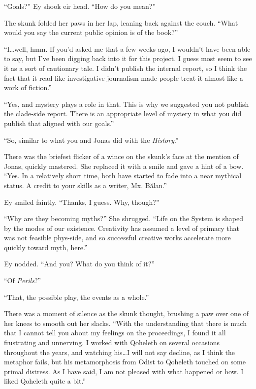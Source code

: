 ``Goals?'' Ey shook eir head. ``How do you mean?''

The skunk folded her paws in her lap, leaning back against the couch. ``What would you say the current public opinion is of the book?''

``I\ldots well, hmm. If you'd asked me that a few weeks ago, I wouldn't have been able to say, but I've been digging back into it for this project. I guess most seem to see it as a sort of cautionary tale. I didn't publish the internal report, so I think the fact that it read like investigative journalism made people treat it almost like a work of fiction.''

``Yes, and mystery plays a role in that. This is why we suggested you not publish the clade-side report. There is an appropriate level of mystery in what you did publish that aligned with our goals.''

``So, similar to what you and Jonas did with the \emph{History}.''

There was the briefest flicker of a wince on the skunk's face at the mention of Jonas, quickly mastered. She replaced it with a smile and gave a hint of a bow. ``Yes. In a relatively short time, both have started to fade into a near mythical status. A credit to your skills as a writer, Mx. Bălan.''

Ey smiled faintly. ``Thanks, I guess. Why, though?''

``Why are they becoming myths?'' She shrugged. ``Life on the System is shaped by the modes of our existence. Creativity has assumed a level of primacy that was not feasible phys-side, and so successful creative works accelerate more quickly toward myth, here.''

Ey nodded. ``And you? What do you think of it?''

``Of \emph{Perils}?''

``That, the possible play, the events as a whole.''

There was a moment of silence as the skunk thought, brushing a paw over one of her knees to smooth out her slacks. ``With the understanding that there is much that I cannot tell you about my feelings on the proceedings, I found it all frustrating and unnerving. I worked with Qoheleth on several occasions throughout the years, and watching his\ldots I will not say decline, as I think the metaphor fails, but his metamorphosis from Odist to Qoheleth touched on some primal distress. As I have said, I am not pleased with what happened or how. I liked Qoheleth quite a bit.''

